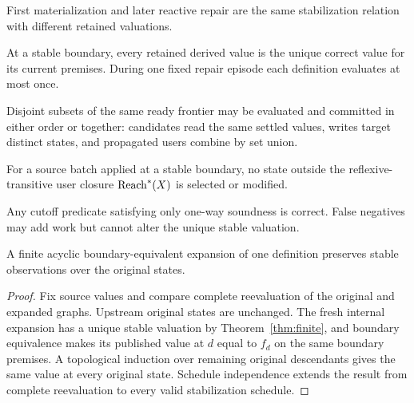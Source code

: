 \begin{corollary} First materialization and later reactive repair are the same stabilization relation with different retained valuations. \end{corollary}
\begin{corollary} At a stable boundary, every retained derived value is the unique correct value for its current premises. During one fixed repair episode each definition evaluates at most once. \end{corollary}
\begin{corollary} Disjoint subsets of the same ready frontier may be evaluated and committed in either order or together: candidates read the same settled values, writes target distinct states, and propagated users combine by set union. \end{corollary}
\begin{corollary}\label{cor:locality} For a source batch applied at a stable boundary, no state outside the reflexive-transitive user closure $\operatorname{Reach}^*(X)$ is selected or modified. \end{corollary}
\begin{corollary} Any cutoff predicate satisfying only one-way soundness is correct. False negatives may add work but cannot alter the unique stable valuation. \end{corollary}

\begin{theorem}\label{thm:expansion}
A finite acyclic boundary-equivalent expansion of one definition preserves stable observations over the original states.
\end{theorem}
\begin{proof}
Fix source values and compare complete reevaluation of the original and expanded graphs. Upstream original states are unchanged. The fresh internal expansion has a unique stable valuation by Theorem~\ref{thm:finite}, and boundary equivalence makes its published value at $d$ equal to $f_d$ on the same boundary premises. A topological induction over remaining original descendants gives the same value at every original state. Schedule independence extends the result from complete reevaluation to every valid stabilization schedule.
\end{proof}


